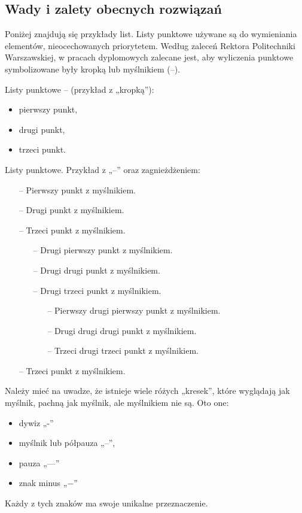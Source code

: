 \subsection{Wady i zalety obecnych rozwiązań}
\noindent Poniżej znajdują się przykłady list. Listy punktowe używane są do wymieniania elementów, 
nieocechowanych priorytetem. Według zaleceń Rektora Politechniki Warszawskiej, w pracach
dyplomowych zalecane jest, aby wyliczenia punktowe symbolizowane były kropką
lub myślnikiem (--).

\noindent Listy punktowe -- (przykład z „kropką”):
\begin{itemize}
    \item pierwszy punkt,
    \item drugi punkt,
    \item trzeci punkt.
\end{itemize}

\noindent Listy punktowe. Przykład z „--” oraz zagnieżdżeniem: 
\begin{itemize}[label=---]
    \item[--] Pierwszy punkt z myślnikiem.
    \item[--] Drugi punkt z myślnikiem.
    \item[--] Trzeci punkt z myślnikiem.
    \begin{itemize}
        \item[--] Drugi pierwszy punkt z myślnikiem.
        \item[--] Drugi drugi punkt z myślnikiem.
        \item[--] Drugi trzeci punkt z myślnikiem.
        \begin{itemize}
            \item[--] Pierwszy drugi pierwszy punkt z myślnikiem.
            \item[--] Drugi drugi drugi punkt z myślnikiem.
            \item[--] Trzeci drugi trzeci punkt z myślnikiem.
        \end{itemize}    
    \end{itemize} 
    
    \item[--] Trzeci punkt z myślnikiem.
\end{itemize}

\noindent Należy mieć na uwadze, że istnieje wiele różych „kresek”, które wyglądają jak 
myślnik, pachną jak myślnik, ale myślnikiem nie są. Oto one:
\begin{itemize}[label=--]
    \item dywiz „-”
    \item myślnik lub półpauza „--”,
    \item pauza „---”
    \item znak minus „$-$”
\end{itemize}   
Każdy z tych znaków ma swoje unikalne przeznaczenie. 

